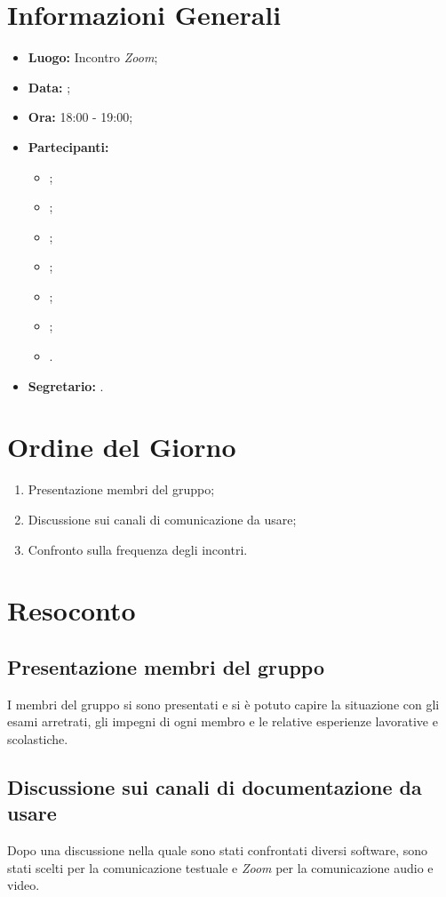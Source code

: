 \section{Informazioni Generali}
\begin{itemize}
\item \textbf{Luogo:} Incontro \textit{Zoom};
\item \textbf{Data:} \Data;
\item \textbf{Ora:} 18:00 - 19:00;
\item \textbf{Partecipanti:}
	\begin{itemize}
		\item \BL{}; 
		\item \FF{};
		\item \MM{}; 
		\item \PC{};
		\item \TG{};
		\item \TL{};
		\item \VD{}.
	\end{itemize} 
\item \textbf{Segretario:} \PC{}.
\end{itemize}

\section{Ordine del Giorno}
\begin{enumerate}
 \item Presentazione membri del gruppo;
 \item Discussione sui canali di comunicazione da usare;
 \item Confronto sulla frequenza degli incontri.
\end{enumerate}

\section{Resoconto}
\subsection{Presentazione membri del gruppo}
I membri del gruppo si sono presentati e si è potuto capire la situazione con gli esami arretrati, gli impegni di ogni membro e le relative esperienze lavorative e scolastiche.

\subsection{Discussione sui canali di documentazione da usare}
Dopo una discussione nella quale sono stati confrontati diversi software, sono stati scelti  per la comunicazione testuale e \textit{Zoom} per la comunicazione audio e video.

